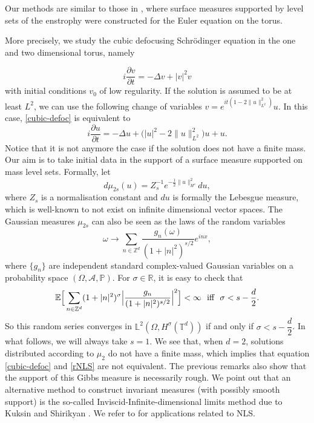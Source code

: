 \documentclass[11pt,leqno]{amsart}
\newcommand{\R}{\mathbb{R}}
\newcommand{\Z}{\mathbb{Z}}
\newcommand{\T}{\mathbb{T}}
\begin{document}
Our methods are similar to those in \cite{C}, where surface measures supported by level sets of the enstrophy were constructed for the Euler equation on the torus.





More precisely, we study the cubic defocusing Schr\" odinger equation in the one and two dimensional torus, namely

\begin{equation}	\label{cubic-defoc}
i\frac{\partial v}{\partial t}= -\Delta v +|v|^2 v
\end{equation}
with initial conditions $v_0$ of low regularity. If the solution is assumed to be at least $L^2$, we can use the following change of variables $v=e^{it (1-2 \|u\|^2_{L^2} )} u$. In this case, 
\eqref{cubic-defoc} is equivalent to 
\begin{equation}
\label{rNLS}
i\frac{\partial u}{\partial t}= -\Delta u+ \Big( |u|^2 -2  \|u \|_{L^2}^2 \Big)u +u .
\end{equation}
Notice that it is not anymore the case if the solution does not have a finite mass.
 Our aim is to take initial data in the support of a surface measure supported on mass level sets. Formally, let
$$  d\mu_{2s}(u) = Z_s^{-1} e^{-\frac{1}{2}\|u\|_{H^s}^2} du,$$
where $Z_s$ is a normalisation constant and $du$ is formally the Lebesgue measure,  which is well-known to not exist on infinite dimensional vector spaces. 
 The Gaussian measures $\mu_{2s}$ can also be seen as the laws of the random variables 
$$\omega \rightarrow \sum_{n\in \Z^d} \dfrac{g_n (\omega)}{(1+|n|^2)^{s/2}} e^{inx},$$
where $\{g_n\}$ are independent standard complex-valued Gaussian variables on a probability space $(\Omega , \mathcal{A},\mathbb{P})$. For $\sigma \in \R$, it is easy to check that
$$\mathbb{E} \Big[\sum_{n\in \Z^d} (1+|n|^2)^{\sigma} \Big|\dfrac{g_n}{(1+|n|^2)^{s/2}} \Big|^2 \Big]<\infty \ ~\hbox{iff}~ \ \sigma<s-\dfrac{d}{2}.$$
So this random series converges in $\mathbb{L}^2 (\Omega , H^\sigma (\T^d))$ if and only if $\sigma < s- \dfrac{d}{2}$. In what follows, we will always take $s=1$. 
We see that, when $d=2$, solutions distributed according to $\mu_2$ do not have a finite mass, which implies that equation \eqref{cubic-defoc} and \eqref{rNLS} are not equivalent. 
The previous remarks also show that the support of  this Gibbs measure is necessarily rough. We point out that an alternative method to construct invariant measures 
(with possibly smooth support) is the so-called Inviscid-Infinite-dimensional limits method due to Kuksin and Shirikyan \cite{MR2039838,MR3443633}. 
We refer to \cite{MR4709547,MR4312285,MR4503168} 
for applications related to NLS.
\end{document}
